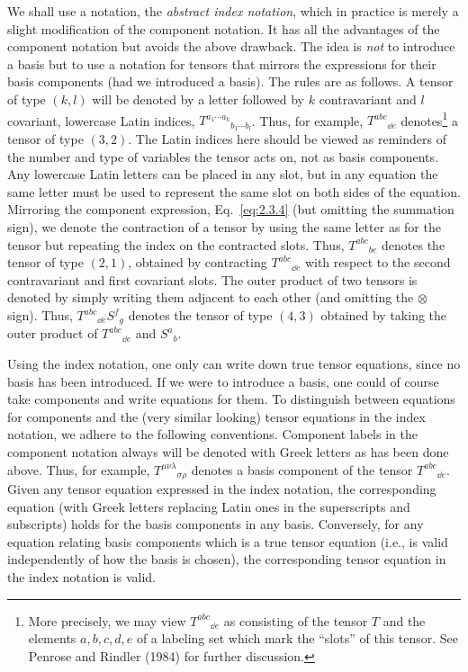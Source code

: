 We shall use a notation, the \emph{abstract index notation}, which in practice is
merely a slight modification of the component notation.  It has all the advantages
of the component notation but avoids the above drawback.  The idea is \emph{not}
to introduce a basis but to use a notation for tensors that mirrors the expressions
for their basis components (had we introduced a basis).  The rules are as follows.
A tensor of type \((k,l)\) will be denoted by a letter followed by \(k\)
contravariant and \(l\) covariant, lowercase Latin indices,
\(T^{a_1\cdots a_k}{}_{b_1\cdots b_l}\).  Thus, for example,
\(T^{abc}{}_{\dd e}\) denotes\footnote{More precisely, we may view \(T^{abc}{}_{\dd e}\)
as consisting of the tensor \(T\) and the elements \(a,b,c,d,e\) of a labeling set
which mark the ``slots'' of this tensor.  See Penrose and Rindler (1984) for further
discussion.} a tensor of type \((3,2)\).  The Latin indices here should be viewed
as reminders of the number and type of variables the tensor acts on, not as basis
components.  Any lowercase Latin letters can be placed in any slot, but in any
equation the same letter must be used to represent the same slot on both sides of
the equation.  Mirroring the component expression, Eq.~\eqref{eq:2.3.4} (but
omitting the summation sign), we denote the contraction of a tensor by using the
same letter as for the tensor but repeating the index on the contracted slots.  Thus,
\(T^{abc}{}_{be}\) denotes the tensor of type \((2,1)\), obtained by contracting
\(T^{abc}{}_{\dd e}\) with respect to the second contravariant and first covariant
slots.  The outer product of two tensors is denoted by simply writing them adjacent
to each other (and omitting the \(\otimes\) sign).  Thus,
\(T^{abc}{}_{\dd e}S^f{}_g\) denotes the tensor of type \((4,3)\) obtained by taking
the outer product of \(T^{abc}{}_{\dd e}\) and \(S^a{}_b\).

Using the index notation, one only can write down true tensor equations, since no
basis has been introduced.  If we were to introduce a basis, one could of course
take components and write equations for them.  To distinguish between equations
for components and the (very similar looking) tensor equations in the index
notation, we adhere to the following conventions.  Component labels in the component
notation always will be denoted with Greek letters as has been done above.  Thus,
for example, \(T^{\mu\nu\lambda}{}_{\sigma\rho}\) denotes a basis component of the
tensor \(T^{abc}{}_{\dd e}\).  Given any tensor equation expressed in the index
notation, the corresponding equation (with Greek letters replacing Latin ones in the
superscripts and subscripts) holds for the basis components in any basis.
Conversely, for any equation relating basis components which is a true tensor
equation (i.e., is valid independently of how the basis is chosen), the corresponding
tensor equation in the index notation is valid.

